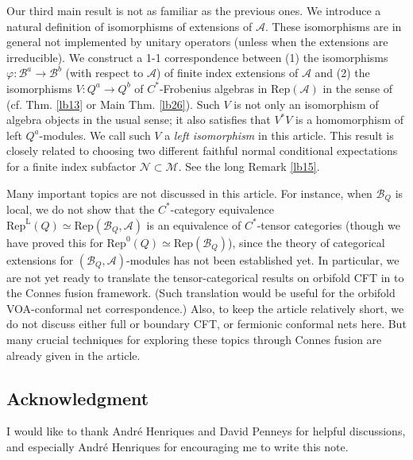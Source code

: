 \documentclass[12pt,a4paper,notitlepage]{article}
\theoremstyle{definition}
\theoremstyle{plain}
\newcommand{\mc}{\mathcal}
\newcommand{\Rep}{\mathrm{Rep}}
\newcommand{\RepA}{\mathrm{Rep}(\mathcal A)}
\newcommand{\RepL}{\mathrm{Rep}^{\mathrm{L}}}
\numberwithin{equation}{section}
\begin{document}
	
Our third main result is not as familiar as the previous ones. We introduce a natural definition of isomorphisms of extensions of $\mc A$. These isomorphisms are in general not implemented by unitary operators (unless when the extensions are irreducible).  We construct a 1-1 correspondence between (1) the isomorphisms $\varphi:\mc B^a\rightarrow\mc B^b$ (with respect to $\mc A$)  of finite index extensions of $\mc A$ and (2) the isomorphisms $V:Q^a\rightarrow Q^b$ of $C^*$-Frobenius algebras in $\RepA$ in the sense of \cite{NY18} (cf. Thm. \ref{lb13} or Main Thm. \ref{lb26}). Such  $V$ is not only an isomorphism of algebra objects in the usual sense; it also satisfies that $V^*V$ is a homomorphism of left $Q^a$-modules. We call such $V$ a \emph{left isomorphism} in this article. This result is closely related to choosing two different faithful normal conditional expectations for a finite index subfactor $\mc N\subset\mc M$. See the long Remark \ref{lb15}.



Many important topics are not discussed in this article. For instance, when $\mc B_Q$ is local, we do not show that the $C^*$-category equivalence $\RepL(Q)\simeq\Rep(\mc B_Q,\mc A)$ is an equivalence of $C^*$-tensor categories (though we have proved this for $\Rep^0(Q)\simeq \Rep(\mc B_Q)$), since the theory of categorical extensions for $(\mc B_Q,\mc A)$-modules has not been established yet. In particular, we are not yet ready to translate the tensor-categorical results on orbifold CFT in \cite{Mug05} to the Connes fusion framework. (Such translation would be useful for the orbifold VOA-conformal net correspondence.) Also, to keep the article relatively short, we do not discuss either full or boundary CFT, or  fermionic conformal nets here. But many crucial  techniques for exploring these topics through Connes fusion are already given in the article.











\subsection*{Acknowledgment}

I would like to thank Andr\'e Henriques and David Penneys for helpful discussions, and especially Andr\'e Henriques for encouraging me to write this note.

	
	
\end{document}
